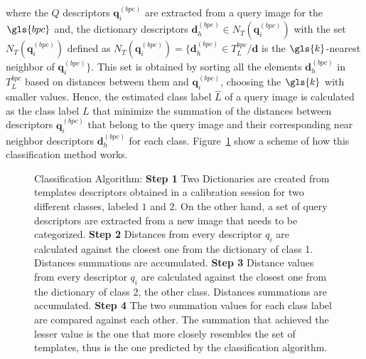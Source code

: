 \noindent where the $Q$ descriptors $ \mathbf{q}_{i}^{(bpc)} $ are extracted from a query image for the $\gls{bpc}$ and, the dictionary descriptors  $\mathbf{d}_{h}^{(bpc)} \in N_T(  \mathbf{q}_{i}^{(bpc)} )$ with the set $N_T(  \mathbf{q}_{i}^{(bpc)} ) $ defined as $N_T(  \mathbf{q}_{i}^{(bpc)} ) = \{ \mathbf{d}_{h}^{(bpc)} \in T_{L}^{bpc} / \mathbf{d} $ is the $\gls{k}$-nearest neighbor of $  \mathbf{q}_{i}^{(bpc)} \}$.  This set is obtained by sorting all the elements $ \mathbf{d}_{h}^{(bpc)} $ in $T_{L}^{bpc}$ based on distances between them and $\mathbf{q}_{i}^{(bpc)}$, choosing the $\gls{k}$ with smaller values.  Hence, the estimated class label $\hat{L}$ of a query image is calculated as the class label $L$ that minimize the summation of the distances between descriptors $\mathbf{q}_{i}^{(bpc)}$ that belong to the query image and their corresponding near neighbor descriptors $\mathbf{d}_{h}^{(bpc)} $  for each class. Figure~\ref{fig:nbnnclassification} show a scheme of how this classification method works.

\begin{figure}[h!]
\centering
{}
\caption[NBNN Classification]{Classification Algorithm: \textbf{Step 1} Two Dictionaries are created from templates descriptors obtained in a calibration session for two different classes, labeled $1$ and $2$. On the other hand, a set of query descriptors are extracted from a new image that needs to be categorized. \textbf{Step 2} Distances from every descriptor $q_i$ are calculated against the closest one from the dictionary of class 1.  Distances summations are accumulated. \textbf{Step 3} Distance values from every descriptor $q_i$ are calculated against the closest one from the dictionary of class 2, the other class.  Distances summations are accumulated. \textbf{Step 4 }The two summation values for each class label are compared against each other. The summation that achieved the lesser value is the one that more closely resembles the set of templates, thus is the one predicted by the classification algorithm.}
\label{fig:nbnnclassification}
\end{figure}

